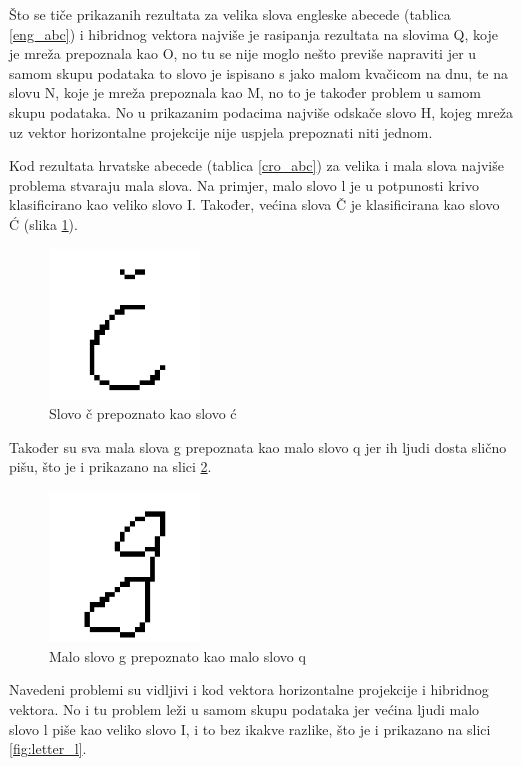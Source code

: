 Što se tiče prikazanih rezultata za velika slova engleske abecede (tablica \ref{eng_abc}) i hibridnog vektora najviše je rasipanja rezultata na slovima Q, koje je mreža prepoznala kao O, no tu se nije moglo nešto previše napraviti jer u samom skupu podataka to slovo je ispisano s jako malom kvačicom na dnu, te na slovu N, koje je mreža prepoznala kao M, no to je također problem u samom skupu podataka. No u prikazanim podacima najviše odskače slovo H, kojeg mreža uz vektor horizontalne projekcije nije uspjela prepoznati niti jednom.

Kod rezultata hrvatske abecede (tablica \ref{cro_abc}) za velika i mala slova najviše problema stvaraju mala slova. Na primjer, malo slovo l je u potpunosti krivo klasificirano kao veliko slovo I.
Također, većina slova Č je klasificirana kao slovo Ć (slika \ref{fig:letter_ch}).
 \begin{figure}[htb]
    \centering
    \includegraphics[width=4cm]{images/ch.png}
    \caption{Slovo č prepoznato kao slovo ć}
    \label{fig:letter_ch}
\end{figure}
Također su sva mala slova g prepoznata kao malo slovo q jer ih ljudi dosta slično pišu, što je i prikazano na slici \ref{fig:letter_g}.
 \begin{figure}[htb]
    \centering
    \includegraphics[width=4cm]{images/g.png}
    \caption{Malo slovo g prepoznato kao malo slovo q}
    \label{fig:letter_g}
\end{figure}
Navedeni problemi su vidljivi i kod vektora horizontalne projekcije i hibridnog vektora. No i tu problem leži u samom skupu podataka jer većina ljudi malo slovo l piše kao veliko slovo I, i to bez ikakve razlike, što je i prikazano na slici \ref{fig:letter_l}.
